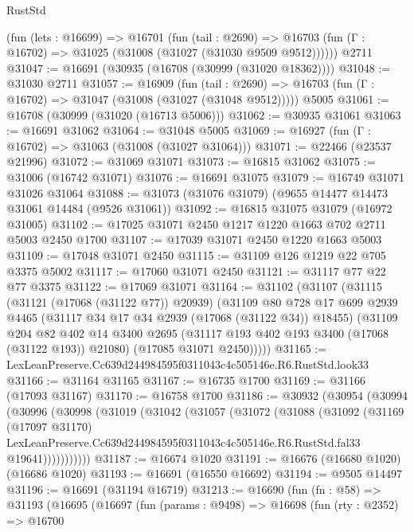 \begin{lexlean}{RustStd}
\begin{coremodule}
    (fun (lets : @16699) =>
    @16701
      (fun (tail : @2690) =>
      @16703 (fun (Γ : @16702) => @31025 (@31008 (@31027 (@31030 @9509 @9512))))))
    @2711
@31047 := @16691 (@30935 (@16708 (@30999 (@31020 @18362))))
@31048 := @31030 @2711
@31057 := @16909
    (fun (tail : @2690) => @16703 (fun (Γ : @16702) => @31047 (@31008 (@31027 (@31048 @9512)))))
    @5005
@31061 := @16708 (@30999 (@31020 (@16713 @5006)))
@31062 := @30935 @31061
@31063 := @16691 @31062
@31064 := @31048 @5005
@31069 := @16927 (fun (Γ : @16702) => @31063 (@31008 (@31027 @31064)))
@31071 := @22466 (@23537 @21996)
@31072 := @31069 @31071
@31073 := @16815 @31062
@31075 := @31006 (@16742 @31071)
@31076 := @16691 @31075
@31079 := @16749 @31071 @31026 @31064
@31088 := @31073 (@31076 @31079) (@9655 @14477 @14473 @31061 @14484 (@9526 @31061))
@31092 := @16815 @31075 @31079 (@16972 @31005)
@31102 := @17025 @31071 @2450 @1217 @1220 @1663 @702 @2711 @5003 @2450 @1700
@31107 := @17039 @31071 @2450 @1220 @1663 @5003
@31109 := @17048 @31071 @2450
@31115 := @31109 @126 @1219 @22 @705 @3375 @5002
@31117 := @17060 @31071 @2450
@31121 := @31117 @77 @22 @77 @3375
@31122 := @17069 @31071
@31164 := @31102
    (@31107
      (@31115
        (@31121 (@17068 (@31122 @77)) @20939)
        (@31109
          @80
          @728
          @17
          @699
          @2939
          @4465
          (@31117 @34 @17 @34 @2939 (@17068 (@31122 @34)) @18455)
          (@31109
            @204
            @82
            @402
            @14
            @3400
            @2695
            (@31117 @193 @402 @193 @3400 (@17068 (@31122 @193)) @21080)
            (@17085 @31071 @2450)))))
@31165 := LexLeanPreserve.Cc639d244984595f0311043c4c505146e.R6.RustStd.look33
@31166 := @31164 @31165
@31167 := @16735 @1700
@31169 := @31166 (@17093 @31167)
@31170 := @16758 @1700
@31186 := @30932
    (@30954
      (@30994
        (@30996
          (@30998
            (@31019
              (@31042
                (@31057
                  (@31072
                    (@31088
                      (@31092
                        (@31169
                          (@17097 @31170)
                          LexLeanPreserve.Cc639d244984595f0311043c4c505146e.R6.RustStd.fal33
                          @19641)))))))))))
@31187 := @16674 @1020
@31191 := @16676 (@16680 @1020) (@16686 @1020)
@31193 := @16691 (@16550 @16692)
@31194 := @9505 @14497
@31196 := @16691 (@31194 @16719)
@31213 := @16690
    (fun (fn : @58) =>
    @31193
      (@16695
        (@16697
          (fun (params : @9498) =>
          @16698
            (fun (rty : @2352) =>
            @16700

\end{coremodule}
\end{lexlean}
